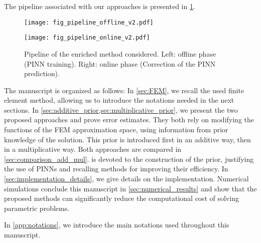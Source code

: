 The pipeline associated with our approaches is presented in \cref{fig:pipeline}.

\begin{figure}[!ht]
    \centering
    \begin{minipage}{0.48\textwidth}
        \centering
        \texttt{[image: fig\_pipeline\_offline\_v2.pdf]}
    \end{minipage}
    \begin{minipage}{0.48\textwidth}
        \centering
        \texttt{[image: fig\_pipeline\_online\_v2.pdf]}
    \end{minipage}
    \caption{Pipeline of the enriched method considered. Left: offline phase (PINN training). Right: online phase (Correction of the PINN prediction).}
    \label{fig:pipeline}
\end{figure}




The manuscript is organized as follows:
In \cref{sec:FEM}, we recall the used finite element method, allowing us to introduce the notations needed in the next sections.
In \cref{sec:additive_prior,sec:multiplicative_prior}, we present the two proposed approaches and prove error estimates.
They both rely on modifying the functions of the FEM approximation space, using information from prior knowledge of the solution.
This prior is introduced first in an additive way, then in a multiplicative way.
Both approaches are compared in \cref{sec:comparison_add_mul}.
 is devoted to the construction of the prior, justifying the use of PINNs and recalling methods for improving their efficiency.
In \cref{sec:implementation_details}, we give details on the implementation.
Numerical simulations conclude this manuscript in \cref{sec:numerical_results} and show that the proposed methods can significantly reduce the computational cost of solving parametric problems.

In \cref{app:notations}, we introduce the main notations used throughout this manuscript.


